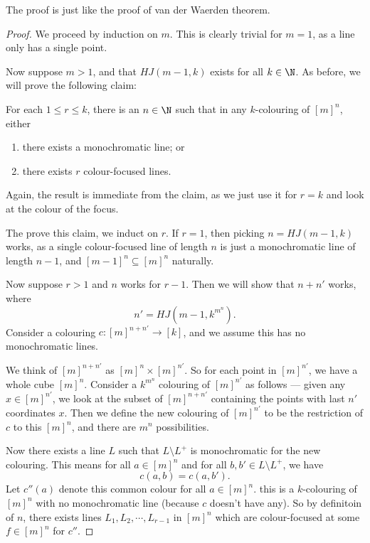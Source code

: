 \documentclass[a4paper]{article}
\begin{document}
The proof is just like the proof of van der Waerden theorem.
\begin{proof}
  We proceed by induction on $m$. This is clearly trivial for $m = 1$, as a line only has a single point.

  Now suppose $m > 1$, and that $HJ(m - 1, k)$ exists for all $k \in \N$. As before, we will prove the following claim:
  \begin{claim}
    For each $1 \leq r \leq k$, there is an $n \in \N$ such that in any $k$-colouring of $[m]^n$, either
    \begin{enumerate}
      \item there exists a monochromatic line; or
      \item there exists $r$ colour-focused lines.
    \end{enumerate}
  \end{claim}
  Again, the result is immediate from the claim, as we just use it for $r = k$ and look at the colour of the focus.

  The prove this claim, we induct on $r$. If $r = 1$, then picking $n = HJ(m - 1, k)$ works, as a single colour-focused line of length $n$ is just a monochromatic line of length $n - 1$, and $[m - 1]^n \subseteq [m]^n$ naturally.

  Now suppose $r > 1$ and $n$ works for $r - 1$. Then we will show that $n + n'$ works, where
  \[
    n' = HJ(m - 1, k^{m^n}).
  \]
  Consider a colouring $c: [m]^{n + n'} \to [k]$, and we assume this has no monochromatic lines.

  We think of $[m]^{n + n'}$ as $[m]^n \times [m]^{n'}$. So for each point in $[m]^{n'}$, we have a whole cube $[m]^n$. Consider a $k^{m^n}$ colouring of $[m]^{n'}$ as follows --- given any $x \in [m]^{n'}$, we look at the subset of $[m]^{n + n'}$ containing the points with last $n'$ coordinates $x$. Then we define the new colouring of $[m]^{n'}$ to be the restriction of $c$ to this $[m]^n$, and there are $m^n$ possibilities.

  Now there exists a line $L$ such that $L \setminus L^+$ is monochromatic for the new colouring. This means for all $a \in [m]^n$ and for all $b, b' \in L\setminus L^+$, we have
  \[
    c(a, b) = c(a, b').
  \]
  Let $c''(a)$ denote this common colour for all $a \in [m]^n$. this is a $k$-colouring of $[m]^n$ with no monochromatic line (because $c$ doesn't have any). So by definitoin of $n$, there exists lines $L_1, L_2, \cdots, L_{r - 1}$ in $[m]^n$ which are colour-focused at some $f \in [m]^n$ for $c''$.


\end{proof}
\end{document}
